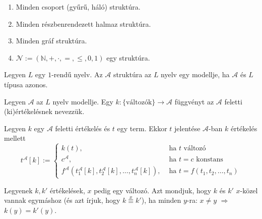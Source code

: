 \begin{exmpl}
\begin{minipage}[t]{\linewidth}
\begin{enumerate}
\item Minden csoport (gyűrű, háló) struktúra.
\item Minden részbenrendezett halmaz struktúra.
\item Minden gráf struktúra.
\item $\mathcal{N} := ( \mathbb{N}, +, \cdot, =, \leqslant, 0,1)$ egy struktúra.
\end{enumerate}
\end{minipage}
\end{exmpl}

\begin{defi} Legyen $L$ egy $1$-rendű nyelv. Az $\mathcal{A}$ struktúra az $L$ nyelv egy modellje, ha $\mathcal{A}$ és $L$ típusa azonos.
\end{defi}
\begin{defi}Legyen $\mathcal{A}$ az $L$ nyelv modellje. Egy $k: \lbrace \text{változók} \rbrace \rightarrow \mathcal{A}$ függvényt az $\mathcal{A}$ feletti (ki)értékelésnek nevezzük.
\end{defi}
\begin{defi} Legyen $k$ egy $\mathcal{A}$ feletti értékelés és $t$ egy term. Ekkor $t$ jelentése $\mathcal{A}$-ban $k$ értékelés mellett
$$t^\mathcal{A}[k] := 
\begin{cases}
k(t), & \text{ ha $t$ változó} \\
c^\mathcal{A}, & \text{ ha $t=c$ konstans} \\
f^{\mathcal{A}}(t^{\mathcal{A}}_1[k], t^{\mathcal{A}}_2[k], \ldots, t^{\mathcal{A}}_n[k]), & \text{ ha $t = f(t_1, t_2, \ldots, t_n)$}
\end{cases}
$$
\end{defi}
\begin{defi} Legyenek $k, k'$ értékelések, $x$ pedig egy változó. Azt mondjuk, hogy $k$ és $k'$ $x$-közel vannak egymáshoz (és azt írjuk, hogy $k \stackrel{x}{\equiv} k'$), ha minden $y$-ra: $x \neq y$ $\Rightarrow$ $k(y)=k'(y)$.
\end{defi}
